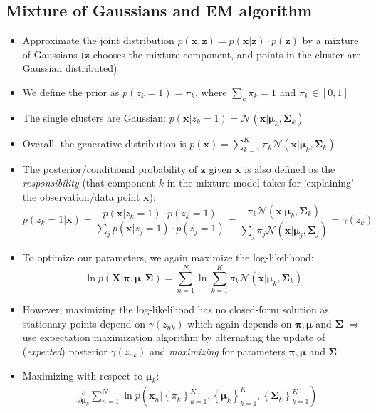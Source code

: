 \subsection{Mixture of Gaussians and EM algorithm}
\begin{itemize}
	\item Approximate the joint distribution $p\left(\bm{x},\bm{z}\right)=p\left(\bm{x}|\bm{z}\right)\cdot p\left(\bm{z}\right)$ by a mixture of Gaussians ($\bm{z}$ chooses the mixture component, and points in the cluster are Gaussian distributed)
	\item We define the prior as $p\left(z_k=1\right)=\pi_k$, where $\sum_k \pi_k= 1$ and $\pi_k \in [0,1]$
	\item The single clusters are Gaussian: $p\left(\bm{x}|z_k=1\right) = \mathcal{N}\left(\bm{x}|\bm{\mu}_k, \bm{\Sigma}_k\right)$
	\item Overall, the generative distribution is $p\left(\bm{x}\right) = \sum_{k=1}^{K} \pi_k \mathcal{N}\left(\bm{x}|\bm{\mu}_k, \bm{\Sigma}_k\right)$
	\item The posterior/conditional probability of $\bm{z}$ given $\bm{x}$ is also defined as the \textit{responsibility} (that component $k$ in the mixture model takes for 'explaining' the observation/data point $\bm{x}$):
	$$p\left(z_k=1|\bm{x}\right) = \frac{p\left(\bm{x}|z_k=1\right)\cdot p\left(z_k=1\right)}{\sum_j p\left(\bm{x}|z_j=1\right)\cdot p\left(z_j=1\right)}=\frac{\pi_k \mathcal{N}\left(\bm{x}|\bm{\mu}_k, \bm{\Sigma}_k\right)}{\sum_j \pi_j \mathcal{N}\left(\bm{x}|\bm{\mu}_j, \bm{\Sigma}_j\right)} = \gamma\left(z_{k}\right)$$
	\item To optimize our parameters, we again maximize the log-likelihood:
	$$\ln p\left(\bm{X}|\bm{\pi}, \bm{\mu}, \bm{\Sigma}\right) = \sum\limits_{n=1}^{N} \ln \sum\limits_{k=1}^{K} \pi_k \mathcal{N}\left(\bm{x}|\bm{\mu}_k, \bm{\Sigma}_k\right)$$
	\item However, maximizing the log-likelihood has no closed-form solution as stationary points depend on $\gamma\left(z_{nk}\right)$ which again depends on $\bm{\pi}, \bm{\mu}$ and $\bm{\Sigma}$ $\Rightarrow$ use expectation maximization algorithm by alternating the update of (\textit{expected}) posterior $\gamma\left(z_{nk}\right)$ and \textit{maximizing} for parameters $\bm{\pi}, \bm{\mu}$ and $\bm{\Sigma}$
	\item Maximizing with respect to $\bm{\mu}_k$:
	\begin{equation*}
		\begin{split}
			& \frac{\partial}{\partial \bm{\mu}_k} \sum\limits_{n=1}^{N} \ln p\left(\bm{x}_n|\left\{\pi_k\right\}_{k=1}^{K}, \left\{\bm{\mu}_k\right\}_{k=1}^{K}, \left\{\bm{\Sigma}_k\right\}_{k=1}^{K}\right)\\

\end{split}
\end{equation*}
\end{itemize}
